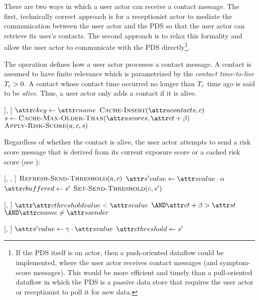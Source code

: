 There are two ways in which a user actor can receive a contact message. The first, technically correct approach is for a receptionist actor to mediate the communication between the user actor and the PDS so that the user actor can retrieve its user's contacts. The second approach is to relax this formality and allow the user actor to communicate with the PDS directly\footnote{If the PDS itself is an actor, then a push-oriented dataflow could be implemented, where the user actor receives contact messages (and symptom-score messages). This would be more efficient and timely than a pull-oriented dataflow in which the PDS is a passive data store that requires the user actor or receptionist to poll it for new data.}.

The \cHandleContact operation defines how a user actor processes a contact message. A contact is assumed to have finite relevance which is parametrized by the \emph{contact time-to-live} $T_c > 0$. A contact whose contact time occurred no longer than $T_c$ time ago is said to be \emph{alive}. Thus, a user actor only adds a contact if it is alive.
%
\begin{function}{\nHandleContact}[\vActor, \vContact]
    \State $\aContactKey \assign \aContactName$
    \State $\cCacheInsert[\aActorContacts, \vContact]$
    \State $\vScore \assign \cCacheMaxOlderThan[\aActorScores, \aContactTime + \pTimeBuffer]$
    \State $\cApplyRiskScore[\vActor, \vContact, \vScore]$
  \EndIf
\end{function}
%
Regardless of whether the contact is alive, the user actor attempts to send a risk score message that is derived from its current exposure score or a cached risk score (see ):
%
\begin{function}{\nApplyRiskScore}[\vActor, \vContact, \vScore]
  \State $\cRefreshSendThreshold[\vActor, \vContact]$
  \If{$\cShouldContactReceive[\vContact, \vScore]$}
    \State $\aNewScoreValue \assign \aScoreValue \cdot \pTransmissionRate$
    \State $\aContactBuffered \assign \vNewScore$
    \State $\cSetSendThreshold[\vContact, \vNewScore]$
  \EndIf
\end{function}
%
\begin{function}{\nShouldContactReceive}[\vContact, \vScore]
    \State \Return $\aContactThresholdValue < \aScoreValue$
    \Statex $\AND \aContactTime + \pTimeBuffer > \aScoreTime$
    \Statex $\AND \aContactName \notEquals \aScoreSender$
\end{function}
\begin{function}{\nSetSendThreshold}[\vContact, \vScore]
    \State $\aNewScoreValue \assign \pSendCoefficient \cdot \aScoreValue$
    \State $\aContactThreshold \assign \vNewScore$
\end{function}
